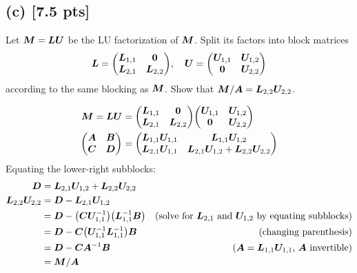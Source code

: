 \documentclass[twoside,10pt]{article}
\begin{document}
\subsection*{(c) [7.5 pts]}
  Let $\bm{M} = \bm{L} \bm{U}$ be the LU factorization of $\bm{M}$. 
  Split its factors into block matrices 
  \begin{equation} 
    \mtx{L} = 
    \begin{pmatrix}
      \mtx{L}_{1, 1} & \mtx{0} \\
      \mtx{L}_{2, 1} & \mtx{L}_{2, 2}
    \end{pmatrix},
    \quad 
    \mtx{U} = 
    \begin{pmatrix}
      \mtx{U}_{1, 1} & \mtx{U}_{1, 2} \\
      \mtx{0} & \mtx{U}_{2, 2}
    \end{pmatrix}
  \end{equation}
  according to the same blocking as $\bm{M}$.
  Show that $\bm{M} / \bm{A} = \bm{L}_{2, 2} \bm{U}_{2, 2}$. 

  \begin{align*}
    \mtx{M}=\mtx{L}\mtx{U}&= \begin{pmatrix}
    \mtx{L}_{1,1} & \mtx{0} \\
    \mtx{L}_{2,1} & \mtx{L}_{2,2}
  \end{pmatrix}
  \begin{pmatrix}
    \mtx{U}_{1,1} & \mtx{U}_{1,2} \\
    \mtx{0} & \mtx{U}_{2,2}
  \end{pmatrix}\\
  \begin{pmatrix}
    \mtx{A} & \mtx{B}\\
    \mtx{C} & \mtx{D}
  \end{pmatrix} &= \begin{pmatrix}
      \mtx{L}_{1,1}\mtx{U}_{1,1} & \mtx{L}_{1,1}\mtx{U}_{1,2} \\
      \mtx{L}_{2,1}\mtx{U}_{1,1} & \mtx{L}_{2,1}\mtx{U}_{1,2}+\mtx{L}_{2,2}\mtx{U}_{2,2}
    \end{pmatrix}
  \end{align*}
  Equating the lower-right subblocks:
  \begin{align*}
    \mtx{D} &= \mtx{L}_{2,1}\mtx{U}_{1,2}+\mtx{L}_{2,2}\mtx{U}_{2,2}\\
    \mtx{L}_{2,2}\mtx{U}_{2,2} &= \mtx{D} - \mtx{L}_{2,1}\mtx{U}_{1,2}\\
    &= \mtx{D} - \left(\mtx{C}\mtx{U}_{1,1}^{-1}\right)\left(\mtx{L}_{1,1}^{-1}\mtx{B}\right)&\text{(solve for $ \mtx{L}_{2,1}$ and $\mtx{U}_{1,2}$ by equating subblocks)}\\
    &= \mtx{D} -\mtx{C}\left(\mtx{U}_{1,1}^{-1}\mtx{L}_{1,1}^{-1}\right)\mtx{B}&\text{(changing parenthesis)}\\
    &= \mtx{D} - \mtx{C} \mtx{A}^{-1} \mtx{B}&\text{($\mtx{A} = \mtx{L}_{1,1}\mtx{U}_{1,1}$, $\mtx{A}$ invertible)}\\
    &= \mtx{M} / \mtx{A}
  \end{align*}
\end{document}
